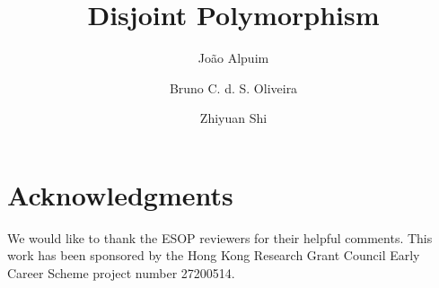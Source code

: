 \documentclass[9pt]{llncs}
\begin{document}

\title{Disjoint Polymorphism}

\author{João Alpuim \and Bruno C. d. S. Oliveira \and Zhiyuan Shi}


\maketitle

\begin{abstract}
  
\end{abstract}










\section*{Acknowledgments}
We would like to thank the ESOP reviewers for their helpful comments.
This work has been sponsored by the Hong Kong Research Grant Council Early Career Scheme project number 27200514.

\newpage



\clearpage
\onecolumn

%
%
\end{document}
